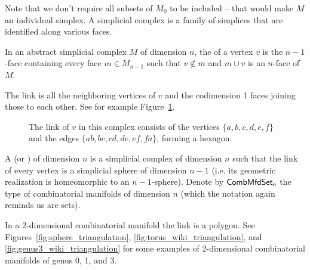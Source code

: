 Note that we don't require all subsets of \( M_0 \) to be included -- that would make \( M \) an individual simplex. A simplicial complex is a family of simplices that are identified along various faces.

\begin{mydef}
In an abstract simplicial complex \( M \) of dimension \( n \), the  of a vertex \( v \) is the \( n-1 \)-face containing every face \( m\in M_{n-1} \) such that \( v\notin m \) and \( m\cup v \) is an \( n \)-face of \( M \).
\label{def:link}
\end{mydef}

The link is all the neighboring vertices of \( v \) and the codimension 1 faces joining those to each other. See for example Figure~\ref{fig:link}.

\begin{figure}[htbp]
\centering
{}
\caption{The link of \( v \) in this complex consists of the vertices \( \{a,b,c,d,e,f\} \) and the edges \( \{ab,bc,cd,de,ef,fa\} \), forming a hexagon.}
\label{fig:link}
\end{figure}

\begin{mydef}
A  (or ) of dimension \( n \) is a simplicial complex of dimension \( n \) such that the link of every vertex is a simplicial sphere of dimension \( n-1 \) (i.e. its geometric realization is homeomorphic to an \( n-1 \)-sphere). Denote by \( \mathsf{CombMfdSet_n} \) the type of combinatorial manifolds of dimension \( n \) (which the notation again reminds us are sets).
\end{mydef}

In a 2-dimensional combinatorial manifold the link is a polygon. See Figures~\ref{fig:sphere_triangulation}, \ref{fig:torus_wiki_triangulation}, and \ref{fig:genus3_wiki_triangulation} for some examples of 2-dimensional combinatorial manifolds of genus 0, 1, and 3.

